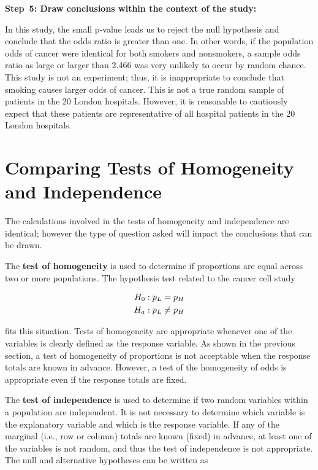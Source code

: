 \documentclass[
]{book}
\begin{document}
\textbf{Step~5: Draw conclusions within the context of the study:}

In this study, the small p-value leads us to reject the null hypothesis and conclude that the odds ratio is greater than one. In other words, if the population odds of cancer were identical for both smokers and nonsmokers, a sample odds ratio as large or larger than 2.466 was very unlikely to occur by random chance. This study is not an experiment; thus, it is inappropriate to conclude that smoking causes larger odds of cancer. This is not a true random sample of patients in the 20 London hospitals. However, it is reasonable to cautiously expect that these patients are representative of all hospital patients in the 20 London hospitals.

\hypertarget{comparing-tests-of-homogeneity-and-independence}{%
\section{Comparing Tests of Homogeneity and Independence}\label{comparing-tests-of-homogeneity-and-independence}}

The calculations involved in the tests of homogeneity and independence are identical; however the type of question asked will impact the conclusions that can be drawn.

The \textbf{test of homogeneity} is used to determine if proportions are equal across two or more populations. The hypothesis test related to the cancer cell study

\begin{align}
H_0: p_L &= p_H \notag \\ 
H_a: p_L &\neq p_H \notag
\end{align}

fits this situation. Tests of homogeneity are appropriate whenever one of the variables is clearly defined as the response variable. As shown in the previous section, a test of homogeneity of proportions is not acceptable when the response totals are known in advance. However, a test of the homogeneity of odds is appropriate even if the response totals are fixed.

The \textbf{test of independence} is used to determine if two random variables within a population are independent. It is not necessary to determine which variable is the explanatory variable and which is the response variable. If any of the marginal (i.e., row or column) totals are known (fixed) in advance, at least one of the variables is not random, and thus the test of independence is not appropriate. The null and alternative hypotheses can be written as
\end{document}
